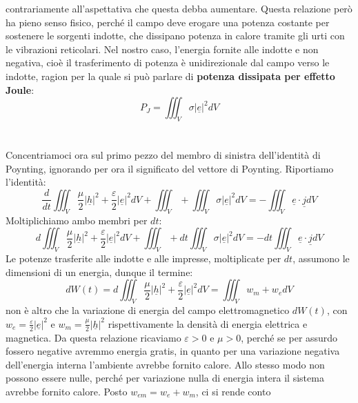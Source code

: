 \documentclass{book}
\begin{document}
        contrariamente all'aspettativa che questa debba aumentare. Questa relazione però ha pieno senso fisico, perché il campo deve erogare una potenza costante per sostenere
        le sorgenti indotte, che dissipano potenza in calore tramite gli urti con le vibrazioni reticolari. Nel nostro caso, l'energia fornite alle indotte e non negativa, cioè il 
        trasferimento di potenza è unidirezionale dal campo verso le indotte, ragion per la quale si può parlare di \textbf{potenza dissipata per effetto Joule}:
        \begin{equation}
            P_{J} = \iiint_{V} \sigma |\underline{e}|^{2}dV
        \end{equation}
        \\ \\
        Concentriamoci ora sul primo pezzo del membro di sinistra dell'identità di Poynting, ignorando per ora il significato del vettore di Poynting. Riportiamo l'identità:
        \begin{equation}
            \frac{d}{dt} \iiint_{V} \frac{\mu}{2}|\underline{h}|^{2}+\frac{\varepsilon}{2}|\underline{e}|^{2}dV+\iiint_{V} + \iiint_{V} \sigma |\underline{e}|^{2}dV = - \iiint_{V}\underline{e}\cdot \underline{j}dV
        \end{equation}
        Moltiplichiamo ambo membri per $dt$:
        \begin{equation}
            d \iiint_{V} \frac{\mu}{2}|\underline{h}|^{2}+\frac{\varepsilon}{2}|\underline{e}|^{2}dV+\iiint_{V} + dt\iiint_{V} \sigma |\underline{e}|^{2}dV = -dt \iiint_{V}\underline{e}\cdot \underline{j}dV
        \end{equation}
        Le potenze trasferite alle indotte e alle impresse, moltiplicate per $dt$, assumono le dimensioni di un energia, dunque il termine:
        \begin{equation}
            dW(t) = d \iiint_{V} \frac{\mu}{2}|\underline{h}|^{2}+\frac{\varepsilon}{2}|\underline{e}|^{2}dV = \iiint_{V} w_{m}+w_{e} dV
        \end{equation}
        non è altro che la variazione di energia del campo elettromagnetico $dW(t)$, con $w_{e} = \frac{\varepsilon}{2}|\underline{e}|^{2}$ 
        e $w_{m}=\frac{\mu}{2}|\underline{h}|^{2}$ rispettivamente la densità di energia elettrica e magnetica. Da questa relazione ricaviamo $\varepsilon>0$ e 
        $\mu >0$, perché se per assurdo fossero negative avremmo energia gratis, in quanto per una variazione negativa dell'energia interna l'ambiente avrebbe fornito calore. Allo stesso modo
        non possono essere nulle, perché per variazione nulla di energia intera il sistema avrebbe fornito calore. Posto $w_{em}= w_{e}+w_{m}$, ci si rende conto 
\end{document}
